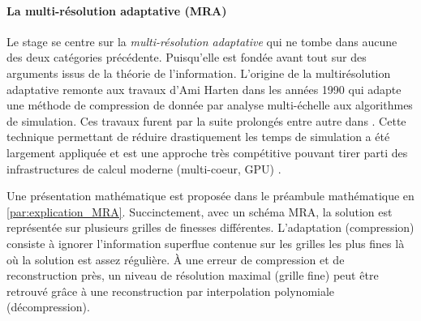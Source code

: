         \paragraph{La multi-résolution adaptative (MRA)}
        Le stage se centre sur la \textit{multi-résolution adaptative} \cite{harten1994} qui
        ne tombe dans aucune des deux catégories précédente. Puisqu'elle est fondée avant tout sur des arguments issus de la théorie de l'information.
        L'origine de la multirésolution adaptative remonte aux travaux d'Ami Harten \cite{harten1994} dans les années 1990 qui adapte 
        une méthode de compression de donnée par analyse multi-échelle aux algorithmes de simulation.
        Ces travaux furent par la suite prolongés entre autre dans \cite{Kaibara2001,Cohen2003}.
        Cette technique permettant de réduire drastiquement les temps de simulation a été largement appliquée et 
        est une approche très compétitive \cite{compare_MRA_AMR} pouvant tirer parti des infrastructures de calcul moderne (multi-coeur, GPU) \cite{GPU_bench}.\par
        Une présentation mathématique est proposée dans le préambule mathématique en \ref{par:explication_MRA}.
        Succinctement, avec un schéma MRA, la solution est représentée sur plusieurs grilles de finesses différentes.
        L'adaptation (compression) consiste à ignorer l'information superflue contenue sur les grilles les plus fines là où la solution est assez régulière.
        À une erreur de compression et de reconstruction près, un niveau de résolution maximal (grille fine) peut être retrouvé 
        grâce à une reconstruction par interpolation polynomiale (décompression).\par 
% 



